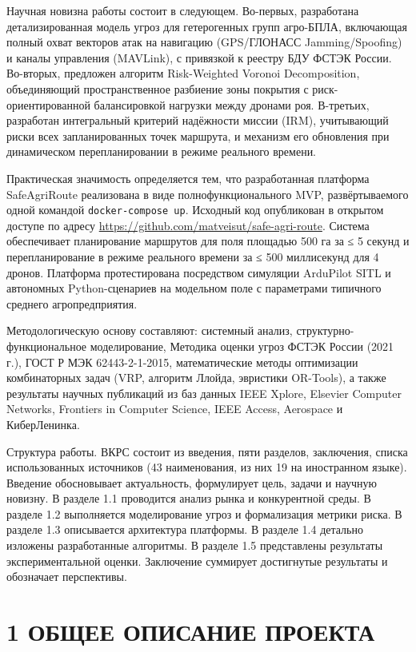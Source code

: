 \documentclass[14pt,a4paper]{extarticle}
\begin{document}
Научная новизна работы состоит в следующем. Во-первых, разработана детализированная модель угроз для гетерогенных групп агро-БПЛА, включающая полный охват векторов атак на навигацию (GPS/ГЛОНАСС Jamming/Spoofing) и каналы управления (MAVLink), с привязкой к реестру БДУ ФСТЭК России. Во-вторых, предложен алгоритм Risk-Weighted Voronoi Decomposition, объединяющий пространственное разбиение зоны покрытия с риск-ориентированной балансировкой нагрузки между дронами роя. В-третьих, разработан интегральный критерий надёжности миссии (IRM), учитывающий риски всех запланированных точек маршрута, и механизм его обновления при динамическом перепланировании в режиме реального времени.

Практическая значимость определяется тем, что разработанная платформа SafeAgriRoute реализована в виде полнофункционального MVP, развёртываемого одной командой \texttt{docker-compose\ up}. Исходный код опубликован в открытом доступе по адресу \url{https://github.com/matveisut/safe-agri-route}. Система обеспечивает планирование маршрутов для поля площадью 500 га за ≤ 5 секунд и перепланирование в режиме реального времени за ≤ 500 миллисекунд для 4 дронов. Платформа протестирована посредством симуляции ArduPilot SITL и автономных Python-сценариев на модельном поле с параметрами типичного среднего агропредприятия.

Методологическую основу составляют: системный анализ, структурно-функциональное моделирование, Методика оценки угроз ФСТЭК России (2021 г.), ГОСТ Р МЭК 62443-2-1-2015, математические методы оптимизации комбинаторных задач (VRP, алгоритм Ллойда, эвристики OR-Tools), а также результаты научных публикаций из баз данных IEEE Xplore, Elsevier Computer Networks, Frontiers in Computer Science, IEEE Access, Aerospace и КиберЛенинка.

Структура работы. ВКРС состоит из введения, пяти разделов, заключения, списка использованных источников (43 наименования, из них 19 на иностранном языке). Введение обосновывает актуальность, формулирует цель, задачи и научную новизну. В разделе 1.1 проводится анализ рынка и конкурентной среды. В разделе 1.2 выполняется моделирование угроз и формализация метрики риска. В разделе 1.3 описывается архитектура платформы. В разделе 1.4 детально изложены разработанные алгоритмы. В разделе 1.5 представлены результаты экспериментальной оценки. Заключение суммирует достигнутые результаты и обозначает перспективы.


\hypertarget{ux43eux431ux449ux435ux435-ux43eux43fux438ux441ux430ux43dux438ux435-ux43fux440ux43eux435ux43aux442ux430}{%
\section{1 ОБЩЕЕ ОПИСАНИЕ ПРОЕКТА}\label{ux43eux431ux449ux435ux435-ux43eux43fux438ux441ux430ux43dux438ux435-ux43fux440ux43eux435ux43aux442ux430}}
\end{document}
